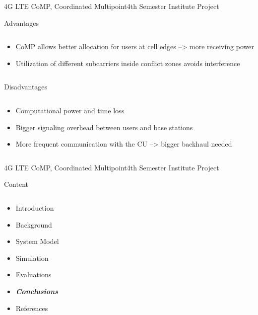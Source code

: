 \documentclass[xcolor={cmyk}]{beamer}
\begin{document}
 \begin{frame}{4G LTE CoMP, Coordinated Multipoint}{4th Semester Institute Project}
	 \begin{block}{Advantages}
	 	\begin{columns}
			\begin{column}{.9\textwidth}
				\begin{itemize}
					\item CoMP allows better allocation for users at cell edges --> more receiving power
					\item Utilization of different subcarriers inside conflict zones avoids interference
				\end{itemize}
			\end{column}
		\end{columns}
	 \end{block}
	 \begin{block}{Disadvantages}
	 	\begin{columns}
			\begin{column}{.9\textwidth}
				\begin{itemize}
					\item Computational power and time loss
					\item Bigger signaling overhead between users and base stations
					\item More frequent communication with the CU --> bigger backhaul needed
				\end{itemize}
			\end{column}
		\end{columns}
	 \end{block}
 \end{frame}

 
\begin{frame}{4G LTE CoMP, Coordinated Multipoint}{4th Semester Institute Project}
	\begin{block}{Content}
		\begin{columns}
			\begin{column}{.9\textwidth}
				\begin{itemize}
					\item Introduction
					\item Background
					\item System Model
					\item Simulation
					\item Evaluations
					\item \textbf{\emph{Conclusions}}
					\item References
				\end{itemize}
			\end{column}
		\end{columns}
	\end{block}
\end{frame}
\end{document}

